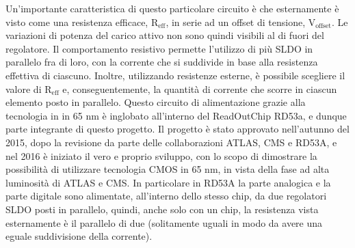 Un'importante caratteristica di questo particolare circuito è che esternamente è visto come una resistenza efficace, $\mathrm{R_{eff}}$, in serie ad un offset di tensione, $\mathrm{V_{offset}}$.
Le variazioni di potenza del carico attivo non sono quindi visibili al di fuori del regolatore.
Il comportamento resistivo permette l'utilizzo di più SLDO in parallelo fra di loro, con la corrente che si suddivide in base alla resistenza effettiva di ciascuno.
Inoltre, utilizzando resistenze esterne, è possibile scegliere il valore di $\mathrm{R_{eff}}$ e, conseguentemente, la quantità di corrente che scorre in ciascun elemento posto in parallelo. 
Questo circuito di alimentazione grazie alla tecnologia in in 65 nm è inglobato all'interno del ReadOutChip RD53a\cite{RD53A}, e dunque parte integrante di questo progetto. 
Il progetto è stato approvato nell’autunno del 2015, dopo la revisione da parte delle collaborazioni ATLAS, CMS e RD53A, e nel 2016 è iniziato il vero e proprio sviluppo, con lo scopo di dimostrare la possibilità di utilizzare tecnologia CMOS in 65 nm, in vista della fase ad alta luminosità di ATLAS e CMS.
In particolare in RD53A la parte analogica e la parte digitale sono alimentate, all'interno dello stesso chip, da due regolatori SLDO posti in parallelo, quindi, anche solo con un chip, la resistenza vista esternamente è il parallelo di due (solitamente uguali in modo da avere una eguale suddivisione della corrente).

